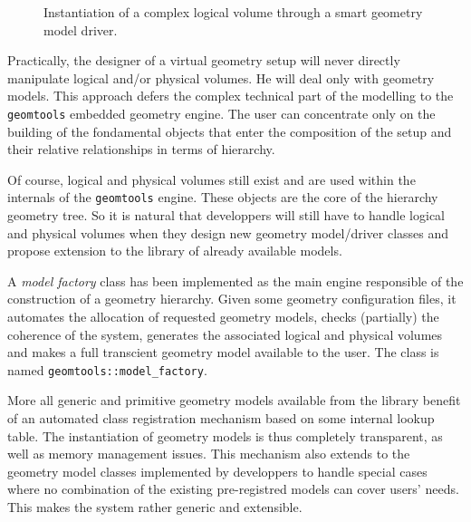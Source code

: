 \begin{figure}[h]
\begin{center}
\scalebox{0.75}{}
\end{center}
\caption{Instantiation of  a complex logical  volume through a smart
geometry model driver.}\label{fig:gm:3}
\end{figure}

Practically,  the designer  of  a virtual  geometry  setup will  never
directly manipulate logical and/or physical volumes. He will deal only
with geometry models.  This approach defers the complex technical part
of the  modelling to the \texttt{geomtools}  embedded geometry engine.
The  user can  concentrate only  on  the building  of the  fondamental
objects that  enter the  composition of the  setup and  their relative
relationships in terms of hierarchy.

Of  course, logical  and physical  volumes  still exist  and are  used
within the  internals of the \texttt{geomtools}  engine. These objects
are the  core of the hierarchy  geometry tree.  So it  is natural that
developpers  will still have  to handle  logical and  physical volumes
when  they  design  new  geometry  model/driver  classes  and  propose
extension to the library of already available models.

A \emph{model factory}  class has been implemented as  the main engine
responsible of  the construction of a geometry  hierarchy.  Given some
geometry configuration files, it automates the allocation of requested
geometry  models,  checks (partially)  the  coherence  of the  system,
generates the associated logical and physical volumes and makes a full
transcient geometry model  available to the user.  The  class is named
\texttt{geomtools::model\_factory}.

More  all generic  and primitive  geometry models  available  from the
library benefit of an  automated class registration mechanism based on
some internal  lookup table. The  instantiation of geometry  models is
thus  completely transparent,  as  well as  memory management  issues.
This mechanism also extends  to the geometry model classes implemented
by developpers  to handle  special cases where  no combination  of the
existing pre-registred models can  cover users' needs.  This makes the
system rather generic and extensible.

